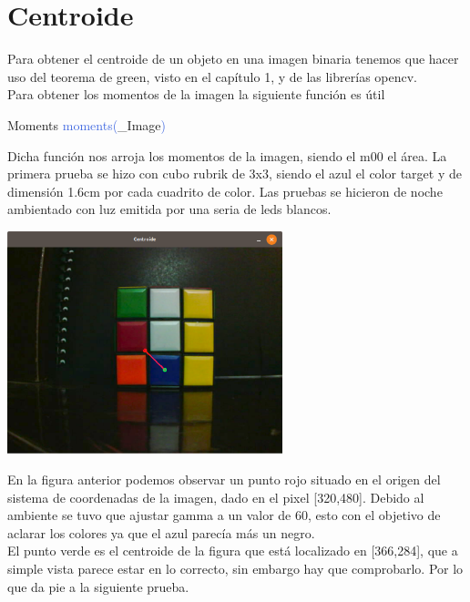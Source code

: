 \section{Centroide}
Para obtener el centroide de un objeto en una imagen binaria tenemos que hacer uso del
teorema de green, visto en el capítulo 1, y de las librerías opencv.\\
Para obtener los momentos de la imagen la siguiente función es útil
\begin{example}[label={ex:serie}]{Moments}
	\textcolor{RoyalBlue}{moments(}\textcolor{Bittersweet}{\_Image}\textcolor{RoyalBlue}{)}
\end{example}
Dicha función nos arroja los momentos de la imagen, siendo el m00 el área. La primera
prueba se hizo con cubo rubrik de 3x3, siendo el azul el color target y de dimensión
1.6cm por cada cuadrito de color. Las pruebas se hicieron de noche ambientado con luz 
emitida por una seria de leds blancos.
\begin{center}
	\includegraphics[width=0.6\textwidth]{Contenido/Cuerpo/Capitulo4/Fig18.eps}
	\label{Fig9}
\end{center}
En la figura anterior podemos observar un punto rojo situado en el origen del sistema
de coordenadas de la imagen, dado en el pixel [320,480]. Debido al ambiente se tuvo
que ajustar gamma a un valor de 60, esto con el objetivo de aclarar los colores
ya que el azul parecía más un negro.\\
El punto verde es el centroide de la figura que está localizado en [366,284], que
a simple vista parece estar en lo correcto, sin embargo hay que comprobarlo. Por lo
que da pie a la siguiente prueba.
